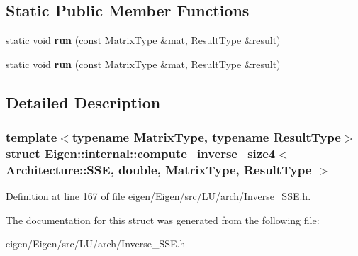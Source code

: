 \subsection*{Static Public Member Functions}
\begin{DoxyCompactItemize}
\item 
\mbox{\label{struct_eigen_1_1internal_1_1compute__inverse__size4_3_01_architecture_1_1_s_s_e_00_01double_00_0ae07abd87bb6c7ddc3170cf276579ed0_a641fad02088ab0ae87dd67428a561e8b}} 
static void {\bfseries run} (const Matrix\+Type \&mat, Result\+Type \&result)
\item 
\mbox{\label{struct_eigen_1_1internal_1_1compute__inverse__size4_3_01_architecture_1_1_s_s_e_00_01double_00_0ae07abd87bb6c7ddc3170cf276579ed0_a641fad02088ab0ae87dd67428a561e8b}} 
static void {\bfseries run} (const Matrix\+Type \&mat, Result\+Type \&result)
\end{DoxyCompactItemize}


\subsection{Detailed Description}
\subsubsection*{template$<$typename Matrix\+Type, typename Result\+Type$>$\newline
struct Eigen\+::internal\+::compute\+\_\+inverse\+\_\+size4$<$ Architecture\+::\+S\+S\+E, double, Matrix\+Type, Result\+Type $>$}



Definition at line \hyperlink{eigen_2_eigen_2src_2_l_u_2arch_2_inverse___s_s_e_8h_source_l00167}{167} of file \hyperlink{eigen_2_eigen_2src_2_l_u_2arch_2_inverse___s_s_e_8h_source}{eigen/\+Eigen/src/\+L\+U/arch/\+Inverse\+\_\+\+S\+S\+E.\+h}.



The documentation for this struct was generated from the following file\+:\begin{DoxyCompactItemize}
\item 
eigen/\+Eigen/src/\+L\+U/arch/\+Inverse\+\_\+\+S\+S\+E.\+h\end{DoxyCompactItemize}
